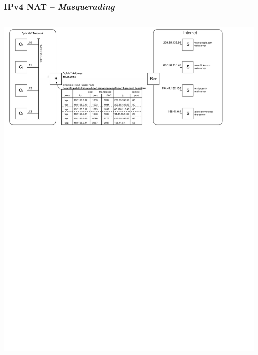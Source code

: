 \documentclass[ignorenonframetext]{beamer}
\begin{document}
\begin{frame}
\frametitle{IPv4 NAT -- {\em Masquerading}}
\vspace{1cm}
\includegraphics[height=18cm]{private-network}
\end{frame}
\end{document}
